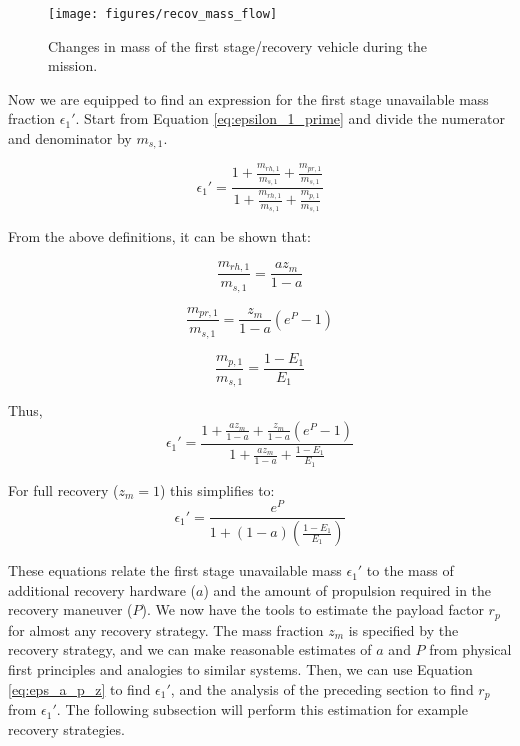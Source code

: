 \documentclass[conf]{new-aiaa}
\begin{document}
\begin{figure}[hbt!]
	\centering
	\texttt{[image: figures/recov\_mass\_flow]}
	\caption{\label{fig:recov_mass_flow} Changes in mass of the first stage/recovery vehicle during the mission.}
\end{figure}

Now we are equipped to find an expression for the first stage unavailable mass fraction $\epsilon_1'$. Start from Equation \ref{eq:epsilon_1_prime} and divide the numerator and denominator by $m_{s,1}$.

\begin{equation}
\epsilon_1' = \frac{1 + \frac{m_{rh,1}}{m_{s,1}} + \frac{m_{pr,1}}{m_{s,1}} }{1 + \frac{m_{rh,1}}{m_{s,1}} + \frac{m_{p,1}}{m_{s,1}} }
\end{equation}

From the above definitions, it can be shown that:

\begin{equation}
\frac{m_{rh,1}}{m_{s,1}} = \frac{a z_m}{1 - a}
\end{equation}

\begin{equation}
\frac{m_{pr,1}}{m_{s,1}} = \frac{z_m}{1 - a} (e^P - 1)
\end{equation}

\begin{equation}
\frac{m_{p,1}}{m_{s,1}} = \frac{1 - E_1}{E_1}
\end{equation}

Thus,
\begin{equation}
\label{eq:eps_a_p_z}
\epsilon_1' = \frac{1 + \frac{a z_m}{1 - a} +  \frac{z_m}{1 - a} (e^P - 1) }{1 + \frac{a z_m}{1 - a} + \frac{1 - E_1}{E_1} }
\end{equation}

For full recovery ($z_m = 1$) this simplifies to:
\begin{equation}
\epsilon_1' = \frac{e^P}{1 + (1 - a) \left( \frac{1 - E_1}{E_1} \right)}
\end{equation}

These equations relate the first stage unavailable mass $\epsilon_1'$ to the mass of additional recovery hardware ($a$) and the amount of propulsion required in the recovery maneuver ($P$). We now have the tools to estimate the payload factor $r_p$ for almost any recovery strategy. The mass fraction $z_m$ is specified by the recovery strategy, and we can make reasonable estimates of $a$ and $P$ from physical first principles and analogies to similar systems. Then, we can use Equation \ref{eq:eps_a_p_z} to find $\epsilon_1'$, and the analysis of the preceding section to find $r_p$ from $\epsilon_1'$. The following subsection will perform this estimation for example recovery strategies.
\end{document}
